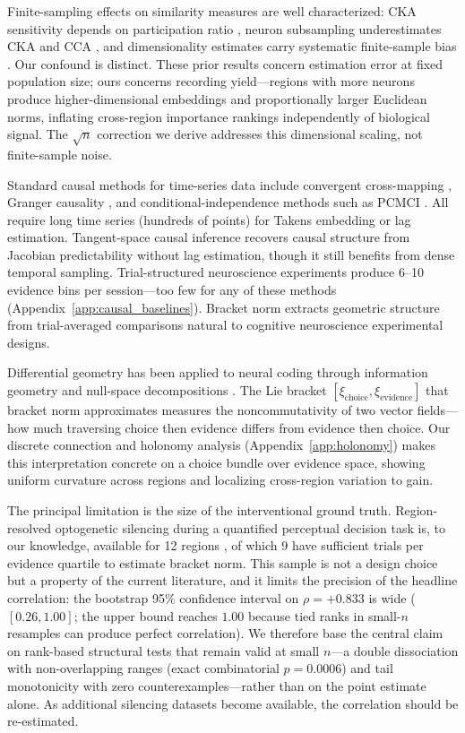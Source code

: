 \documentclass[9pt,lineno]{elife}
\begin{document}
Finite-sampling effects on similarity measures are well characterized: CKA sensitivity depends on participation ratio \citep{harvey2024representational}, neuron subsampling underestimates CKA and CCA \citep{murphy2024biased}, and dimensionality estimates carry systematic finite-sample bias \citep{chung2026dimensionality, spectral2025neurips}. Our confound is distinct. These prior results concern estimation error at fixed population size; ours concerns recording yield---regions with more neurons produce higher-dimensional embeddings and proportionally larger Euclidean norms, inflating cross-region importance rankings independently of biological signal. The $\sqrt{n}$ correction we derive addresses this dimensional scaling, not finite-sample noise.

Standard causal methods for time-series data include convergent cross-mapping \citep{sugihara2012detecting}, Granger causality \citep{granger1969investigating}, and conditional-independence methods such as PCMCI \citep{runge2019detecting}. All require long time series (hundreds of points) for Takens embedding or lag estimation. Tangent-space causal inference \citep{butler2024tsci} recovers causal structure from Jacobian predictability without lag estimation, though it still benefits from dense temporal sampling. Trial-structured neuroscience experiments produce 6--10 evidence bins per session---too few for any of these methods (Appendix~\ref{app:causal_baselines}). Bracket norm extracts geometric structure from trial-averaged comparisons natural to cognitive neuroscience experimental designs.

Differential geometry has been applied to neural coding through information geometry \citep{amari2016information} and null-space decompositions \citep{kaufman2014cortical}. The Lie bracket $[\xi_{\text{choice}}, \xi_{\text{evidence}}]$ that bracket norm approximates measures the noncommutativity of two vector fields---how much traversing choice then evidence differs from evidence then choice. Our discrete connection and holonomy analysis (Appendix~\ref{app:holonomy}) makes this interpretation concrete on a choice bundle over evidence space, showing uniform curvature across regions and localizing cross-region variation to gain.

The principal limitation is the size of the interventional ground truth. Region-resolved optogenetic silencing during a quantified perceptual decision task is, to our knowledge, available for 12 regions \citep{steinmetz2019distributed, zatkahaas2021}, of which 9 have sufficient trials per evidence quartile to estimate bracket norm. This sample is not a design choice but a property of the current literature, and it limits the precision of the headline correlation: the bootstrap 95\% confidence interval on $\rho = +0.833$ is wide ($[0.26, 1.00]$; the upper bound reaches $1.00$ because tied ranks in small-$n$ resamples can produce perfect correlation). We therefore base the central claim on rank-based structural tests that remain valid at small $n$---a double dissociation with non-overlapping ranges (exact combinatorial $p = 0.0006$) and tail monotonicity with zero counterexamples---rather than on the point estimate alone. As additional silencing datasets become available, the correlation should be re-estimated.
\end{document}
